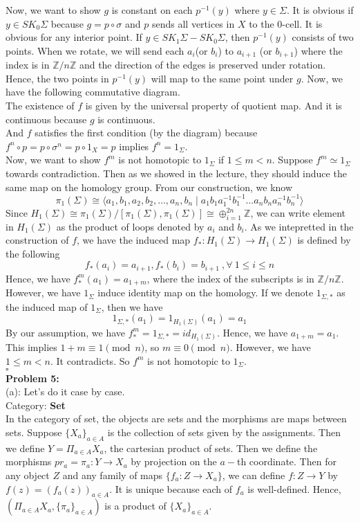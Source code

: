 \documentclass[12pt]{amsart}
\newcommand{\catname}[1]{{\normalfont\textbf{#1}}}
\newcommand{\Set}{\catname{Set}}
\newcommand{\Z}{\mathbb{Z}}
\begin{document}
Now, we want to show $g$ is constant on each $p^{-1}(y)$ where $y\in\Sigma$. It is obvious if $y\in SK_0\Sigma$ because $g=p\circ \sigma$ and $p$ sends all vertices in $X$ to the 0-cell. It is obvious for any interior point. If $y\in SK_1\Sigma-SK_0\Sigma$, then $p^{-1}(y)$ consists of two points. When we rotate, we will send each $a_i$(or $b_i$) to $a_{i+1}$ (or $b_{i+1}$) where the index is in $\Z/n\Z$ and the direction of the edges is preserved under rotation. Hence, the two points in $p^{-1}(y)$ will map to the same point under $g$. Now, we have the following commutative diagram. 
\\The existence of $f$ is given by the universal property of quotient map. And it is continuous because $g$ is continuous.\\
And $f$ satisfies the first condition (by the diagram) because $f^n\circ p=p\circ \sigma^n=p\circ 1_X=p$ implies $f^n=1_\Sigma$.\\
Now, we want to show $f^m$ is not homotopic to $1_\Sigma$ if $1\leq m <n$. Suppose $f^m\simeq 1_\Sigma$ towards contradiction. Then as we showed in the lecture, they should induce the same map on the homology group. From our construction, we know 
\[\pi_1(\Sigma)\cong \langle a_1,b_1,a_2,b_2,\dots, a_n,b_n\mid a_1b_1a_1^{-1}b_1^{-1}\dots a_nb_na_n^{-1}b_n^{-1}\rangle\]
Since $H_1(\Sigma)\cong \pi_1(\Sigma)/[\pi_1(\Sigma),\pi_1(\Sigma)]\cong \oplus_{i=1}^{2n}\Z$, we can write element in $H_1(\Sigma)$ as the product of loops denoted by $a_i$ and $b_i$. As we intepretted in the construction of $f$, we have the induced map $f_\ast:H_1(\Sigma)\to H_1(\Sigma)$ is defined by the following
\[f_\ast(a_i)=a_{i+1},f_\ast(b_i)=b_{i+1}\ ,\forall\  1\leq i\leq n\]
Hence, we have $f^m_\ast(a_1)=a_{1+m}$, where the index of the subscripts is in $\Z/n\Z$. However, we have $1_\Sigma$ induce identity map on the homology. If we denote $1_{\Sigma,\ast}$ as the induced map of $1_\Sigma$, then we have 
\[1_{\Sigma,\ast}(a_1)=1_{H_1(\Sigma)}(a_1)=a_1\]
By our assumption, we have $f^m_\ast=1_{\Sigma,\ast}=id_{H_1(\Sigma)}$. Hence, we have $a_{1+m}=a_1$. This implies $1+m\equiv 1\pmod{n}$, so $m\equiv 0\pmod{n}$. However, we have $1\leq m<n$. It contradicts. So $f^m$ is not homotopic to $1_\Sigma$.
\\\phantom{qed}\hfill$\square$\\
\textbf{Problem 5:}\\
(a): Let's do it case by case.\\
\break
Category: \Set\\
In the category of set, the objects are sets and the morphisms are maps between sets. Suppose $\{X_a\}_{a\in A}$ is the collection of sets given by the assignments. Then we define $Y=\Pi_{a\in A}X_a$, the cartesian product of sets. Then we define the morphisms $pr_a=\pi_a:Y\to X_a$ by projection on the $a-$th coordinate. Then for any object $Z$ and any family of maps $\{f_a:Z\to X_a\}$, we can define $f:Z\to Y$ by $f(z)=(f_a(z))_{a\in A}$. It is unique because each of $f_a$ is well-defined. Hence, $(\Pi_{a\in A}X_a,\{\pi_a\}_{a\in A})$ is a product of $\{X_a\}_{a\in A}$.\\
\end{document}
